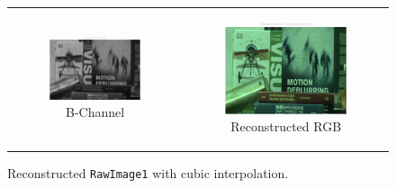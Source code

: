 \documentclass[11pt, a4]{article}
\begin{document}
\begin{enumerate}
\begin{enumerate}
\begin{figure}[H]
{\begin{tabular}{cc}
\begin{subfigure}[h]{0.45\linewidth}
							\centering
							\includegraphics[width=\linewidth]{../output/1_B-channel_cubic.pdf}
							\caption{B-Channel}
							\label{fig:problem1_B_cubic}
						\end{subfigure} &
						\begin{subfigure}[h]{0.45\linewidth}
							\centering
							\includegraphics[width=\linewidth]{../output/1_RGB_cubic.pdf}
							\caption{Reconstructed RGB}
							\label{fig:problem1_RGB_cubic}
						\end{subfigure}
					\end{tabular}
				}
				\caption{Reconstructed \texttt{RawImage1} with cubic interpolation.}
				\label{fig:problem1_cubic}
			\end{figure}
			

\end{enumerate}
\end{enumerate}
\end{document}
